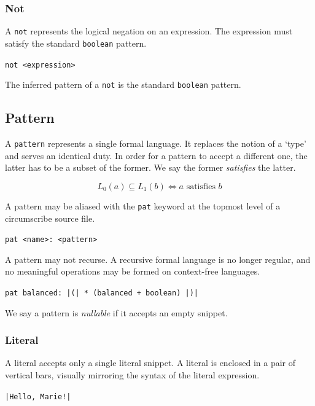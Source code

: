 \documentclass{article}
\begin{document}
\subsubsection{Not}

A \texttt{not} represents the logical negation on an expression. The expression must satisfy 
the standard \texttt{boolean} pattern.

\begin{center}
    \verb|not <expression>|
\end{center}

The inferred pattern of a \texttt{not} is the standard \texttt{boolean} pattern.

\subsection{Pattern}

A \texttt{pattern} represents a single formal language. It replaces the notion of a
`type' and serves an identical duty. In order for a pattern to accept a different one,
the latter has to be a subset of the former. We say the former \emph{satisfies}
the latter.

\[L_0\left(a\right) \subseteq L_1\left(b\right) \iff a\text{ satisfies }b\]

A pattern may be aliased with the \texttt{pat} keyword at the topmost level of a
circumscribe source file.

\begin{center}
    \verb/pat <name>: <pattern>/
\end{center}

A pattern may not recurse. A recursive formal language is no longer regular, and
no meaningful operations may be formed on context-free languages.

\begin{center}
    \verb/pat balanced: |(| * (balanced + boolean) |)|/
\end{center}

We say a pattern is \emph{nullable} if it accepts an empty snippet.

\subsubsection{Literal}

A literal accepts only a single literal snippet. A literal is enclosed in a pair
of vertical bars, visually mirroring the syntax of the literal expression.

\begin{center}
    \verb/|Hello, Marie!|/
\end{center}
\end{document}
